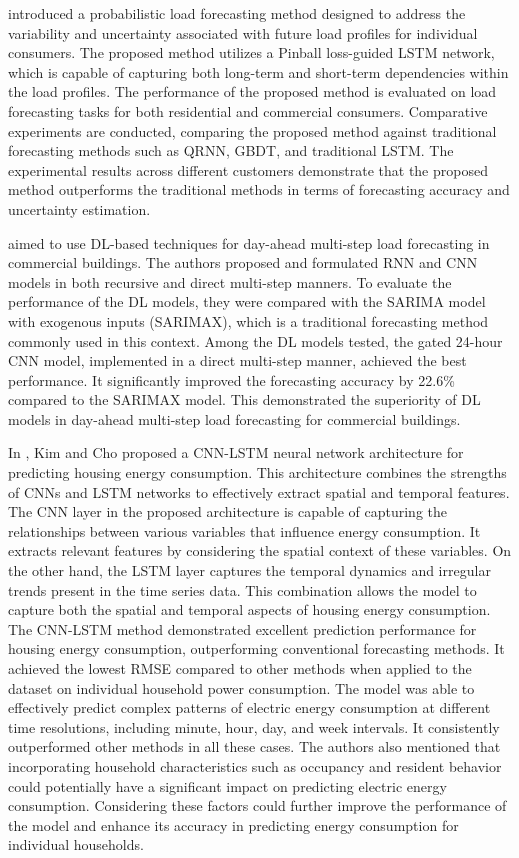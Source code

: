 \cite{WANG201910} introduced a probabilistic load forecasting method designed to address the variability and uncertainty associated with future load profiles for individual consumers.
The proposed method utilizes a Pinball loss-guided LSTM network, which is capable of capturing both long-term and short-term dependencies within the load profiles.
The performance of the proposed method is evaluated on load forecasting tasks for both residential and commercial consumers.
Comparative experiments are conducted, comparing the proposed method against traditional forecasting methods such as QRNN, GBDT, and traditional LSTM.
The experimental results across different customers demonstrate that the proposed method outperforms the traditional methods in terms of forecasting accuracy and uncertainty estimation.

\cite{CAI20191078} aimed to use DL-based techniques for day-ahead multi-step load forecasting in commercial buildings.
The authors proposed and formulated RNN and CNN models in both recursive and direct multi-step manners.
To evaluate the performance of the DL models, they were compared with the SARIMA model with exogenous inputs (SARIMAX), which is a traditional forecasting method commonly used in this context.
Among the DL models tested, the gated 24-hour CNN model, implemented in a direct multi-step manner, achieved the best performance.
It significantly improved the forecasting accuracy by 22.6\% compared to the SARIMAX model.
This demonstrated the superiority of DL models in day-ahead multi-step load forecasting for commercial buildings.

In \cite{KIM201972}, Kim and Cho proposed a CNN-LSTM neural network architecture for predicting housing energy consumption.
This architecture combines the strengths of CNNs and LSTM networks to effectively extract spatial and temporal features.
The CNN layer in the proposed architecture is capable of capturing the relationships between various variables that influence energy consumption.
It extracts relevant features by considering the spatial context of these variables.
On the other hand, the LSTM layer captures the temporal dynamics and irregular trends present in the time series data.
This combination allows the model to capture both the spatial and temporal aspects of housing energy consumption.
The CNN-LSTM method demonstrated excellent prediction performance for housing energy consumption, outperforming conventional forecasting methods.
It achieved the lowest RMSE compared to other methods when applied to the dataset on individual household power consumption.
The model was able to effectively predict complex patterns of electric energy consumption at different time resolutions, including minute, hour, day, and week intervals.
It consistently outperformed other methods in all these cases.
The authors also mentioned that incorporating household characteristics such as occupancy and resident behavior could potentially have a significant impact on predicting electric energy consumption.
Considering these factors could further improve the performance of the model and enhance its accuracy in predicting energy consumption for individual households.

